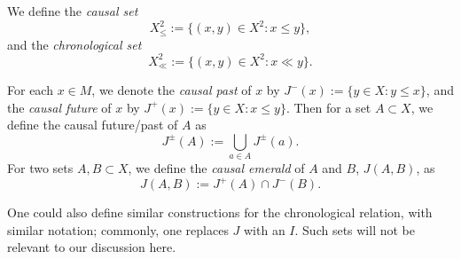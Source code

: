 \documentclass{article}
\theoremstyle{definition}
\begin{document}
We define the {\it causal set} 
\[X_\leq^2:=\{(x,y)\in X^2: x\leq y\},\]
 and the {\it chronological set} 
 \[X_\ll^2:= \{(x,y)\in X^2: x\ll y\}.\] 

For each $x\in M$, we denote the {\it causal past} of $x$ by $J^-(x):=\{y\in X: y\leq x\}$, and the {\it causal future} of $x$ by $J^+(x):=\{y\in X: x\leq y\}$. Then for a set $A\subset X$, we define the causal future/past of $A$ as
\[J^\pm(A):= \bigcup_{a\in A} J^\pm(a).\]
For two sets $A,B\subset X$, we define the {\it causal emerald} of $A$ and $B$, $J(A,B)$, as 
\[J(A,B) := J^+(A)\cap J^-(B).\]

One could also define similar constructions for the chronological relation, with similar notation; commonly, one replaces $J$ with an $I$. Such sets will not be relevant to our discussion here. 
\end{document}
